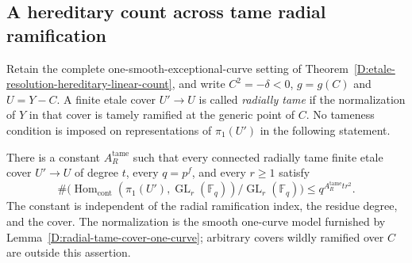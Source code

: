\subsection{A hereditary count across tame radial ramification}

Retain the complete one-smooth-exceptional-curve setting of
Theorem~\ref{D:etale-resolution-hereditary-linear-count}, and write
$C^2=-\delta<0$, $g=g(C)$ and $U=Y-C$. A finite etale cover
$U'\to U$ is called \emph{radially tame} if the normalization
of $Y$ in that cover is tamely ramified at the generic point
of $C$. No tameness condition is imposed on representations
of $\pi_1(U')$ in the following statement.

\begin{theorem}
\label{D:tame-resolution-hereditary-linear-count}
There is a constant $A_R^{\mathrm{tame}}$ such that every
connected radially tame finite etale cover $U'\to U$ of
degree $t$, every $q=p^f$, and every $r\geq1$ satisfy
\[
 \#\bigl(\operatorname{Hom}_{\mathrm{cont}}
       (\pi_1(U'),\operatorname{GL}_r(\mathbb F_q))
                         /\operatorname{GL}_r(\mathbb F_q)\bigr)
                \leq q^{A_R^{\mathrm{tame}}t r^2}.
                                                        \tag{D.TH.1}
\]
The constant is independent of the radial ramification index,
the residue degree, and the cover. The normalization is the
smooth one-curve model furnished by
Lemma~\ref{D:radial-tame-cover-one-curve}; arbitrary covers
wildly ramified over $C$ are outside this assertion.
\end{theorem}

